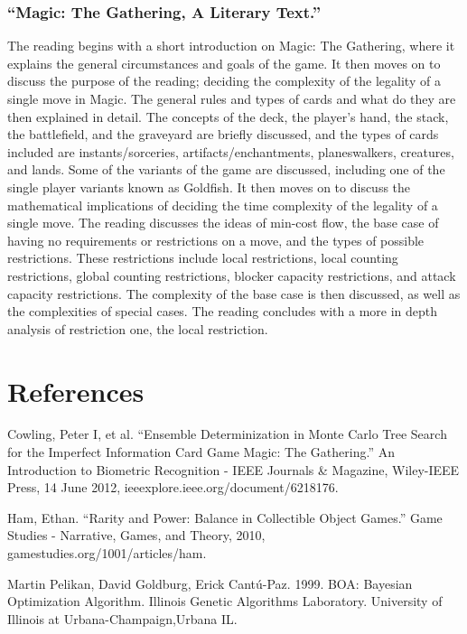 \documentclass[12pt, letterpaper]{article}
\begin{document}
\subsubsection{\enquote{Magic: The Gathering, A Literary Text.}}

The reading begins with a short introduction on Magic: The Gathering,
where it explains the general circumstances and goals of the game.
It then moves on to discuss the purpose of the reading;
deciding the complexity of the legality of a single move in Magic.
The general rules and types of cards and what do they are then explained in detail.
The concepts of the deck, the player’s hand, the stack, the battlefield,
and the graveyard are briefly discussed, and the types of cards included are instants/sorceries,
artifacts/enchantments, planeswalkers, creatures, and lands.
Some of the variants of the game are discussed,
including one of the single player variants known as Goldfish.
It then moves on to discuss the mathematical implications of
deciding the time complexity of the legality of a single move.
The reading discusses the ideas of min-cost flow,
the base case of having no requirements or restrictions on a move,
and the types of possible restrictions.
These restrictions include local restrictions, local counting restrictions,
global counting restrictions, blocker capacity restrictions, and attack capacity restrictions.
The complexity of the base case is then discussed,
as well as the complexities of special cases.
The reading concludes with a more in depth analysis of restriction one, the local restriction.

\section{References}



Cowling, Peter I, et al.
\enquote{Ensemble Determinization in Monte Carlo Tree Search for the Imperfect Information Card Game Magic: The Gathering.}
An Introduction to Biometric Recognition - IEEE Journals \& Magazine, Wiley-IEEE Press,
14 June 2012, ieeexplore.ieee.org/document/6218176.

Ham, Ethan.
\enquote{Rarity and Power: Balance in Collectible Object Games.}
Game Studies - Narrative, Games, and Theory, 2010,
gamestudies.org/1001/articles/ham.


Martin Pelikan, David Goldburg, Erick Cantú-Paz. 1999. BOA: Bayesian Optimization Algorithm. Illinois Genetic Algorithms
Laboratory. University of Illinois at Urbana-Champaign,Urbana IL.
\end{document}
